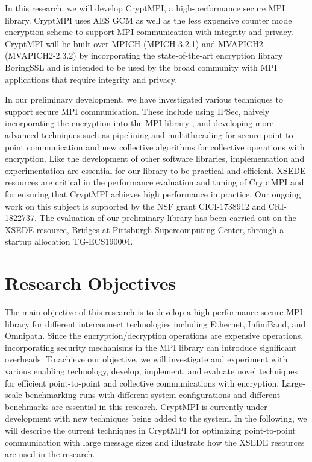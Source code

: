 In this research, we will develop CryptMPI, a high-performance secure MPI library.
CryptMPI uses AES GCM as well as the less expensive counter mode encryption scheme
to support MPI communication with integrity and privacy.
CryptMPI will be built over MPICH (MPICH-3.2.1) and MVAPICH2 (MVAPICH2-2.3.2)
by incorporating the state-of-the-art encryption library BoringSSL and is intended
to be used by the broad community with MPI applications that require integrity
and privacy.

In our preliminary development, we have investigated various techniques to support
secure MPI communication. These include using IPSec, naively incorporating the
encryption into the MPI library \cite{Cluster:Naser19}, and developing more
advanced techniques such as pipelining and multithreading for secure
point-to-point communication and new collective algorithms for collective operations
with encryption. Like the development of other software libraries, implementation and
experimentation are essential for our library to be
practical and efficient. XSEDE resources are critical in the performance
evaluation and tuning of CryptMPI and for ensuring that CryptMPI achieves high performance
in practice. Our ongoing work on this subject is supported by the NSF grant
CICI-1738912 and CRI-1822737. The evaluation of our preliminary library has been carried
out on the XSEDE resource, Bridges at Pittsburgh Supercomputing Center, through a
startup allocation TG-ECS190004. 

\section{Research Objectives}

The main objective of this research is to develop a high-performance secure MPI
library for different interconnect technologies including Ethernet, InfiniBand, and
Omnipath. Since the encryption/decryption operations are expensive operations,
incorporating security mechanisms in the MPI library can introduce significant
overheads. To achieve our objective, we will investigate and experiment with various
enabling technology, develop, implement, and evaluate novel techniques for efficient
point-to-point and collective communications with encryption. Large-scale
benchmarking runs with different system configurations and different benchmarks
are essential in this research. CryptMPI is currently under development with new
techniques being added to the system. In the following, we will describe
the current techniques in CryptMPI for optimizing point-to-point communication with
large message sizes and illustrate how the XSEDE resources are used in the
research. 

